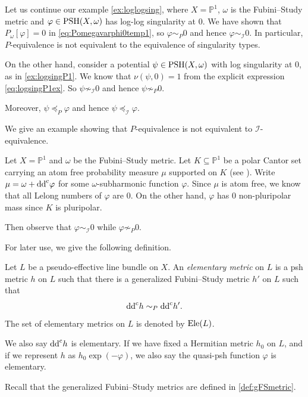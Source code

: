 \begin{example}\label{ex:Pequivnotequivex}
    Let us continue our example \cref{ex:loglogsing}, where $X=\mathbb{P}^1$, $\omega$ is the Fubini--Study metric and $\varphi\in \mathrm{PSH}(X,\omega)$ has log-log singularity at $0$. We have shown that $P_{\omega}[\varphi]=0$ in \eqref{eq:Pomegavarphi0temp1}, so $\varphi\sim_{P} 0$ and hence $\varphi\sim_{\mathcal{I}} 0$. In particular, $P$-equivalence is not equivalent to the equivalence of singularity types.

    On the other hand, consider a potential $\psi\in \mathrm{PSH}(X,\omega)$ with log singularity at $0$, as in \cref{ex:logsingP1}. We know that $\nu(\psi,0)=1$ from the explicit expression \eqref{eq:logsingP1ex}. So $\psi\not\sim_{\mathcal{I}} 0$ and hence $\psi\not\sim_{P} 0$.

    Moreover, $\psi \preceq_{P} \varphi$ and hence $\psi\preceq_{\mathcal{I}}\varphi$.
\end{example}


We give an example showing that $P$-equivalence is not equivalent to $\mathcal{I}$-equivalence.
\begin{example}\label{ex:BBJ}
    Let $X=\mathbb{P}^1$ and $\omega$ be the Fubini--Study metric. Let $K\subseteq \mathbb{P}^1$ be a polar Cantor set carrying an atom free probability measure $\mu$ supported on $K$ (see \cite[Page~31]{Car83}). Write $\mu=\omega+\mathrm{dd}^{\mathrm{c}}\varphi$ for some $\omega$-subharmonic function $\varphi$. Since $\mu$ is atom free, we know that all Lelong numbers of $\varphi$ are $0$. On the other hand, $\varphi$ has $0$ non-pluripolar mass since $K$ is pluripolar.

    Then observe that $\varphi\sim_{\mathcal{I}} 0$ while $\varphi\not\sim_P 0$.
\end{example}

For later use, we give the following definition.
\begin{definition}\label{def:elemetric}
    Let $L$ be a pseudo-effective line bundle on $X$. An \emph{elementary metric} on $L$ is a psh metric $h$ on $L$ such that there is a generalized Fubini--Study metric $h'$ on $L$ such that
    \[
    \mathrm{dd}^{\mathrm{c}} h\sim_{P} \mathrm{dd}^{\mathrm{c}} h'.
    \]
    The set of elementary metrics on $L$ is denoted by $\mathrm{Ele}(L)$.

    We also say $\mathrm{dd}^{\mathrm{c}} h$ is elementary. If we have fixed a Hermitian metric $h_0$ on $L$, and if we represent $h$ as $h_0\exp(-\varphi)$, we also say the quasi-psh function $\varphi$ is elementary.
\end{definition}
Recall that the generalized Fubini--Study metrics are defined in \cref{def:gFSmetric}.

